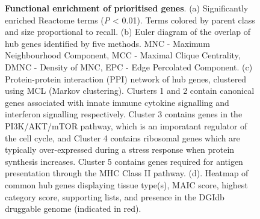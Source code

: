 \documentclass[
  11,
  a4paper,
]{article}
\begin{document}
\begin{figure}


\caption{\label{fig-fig2}\textbf{Functional enrichment of prioritised
genes}. (a) Significantly enriched Reactome terms (\emph{P} \textless{}
0.01). Terms colored by parent class and size proportional to recall.
(b) Euler diagram of the overlap of hub genes identified by five
methods. MNC - Maximum Neighbourhood Component, MCC - Maximal Clique
Centrality, DMNC - Density of MNC, EPC - Edge Percolated Component. (c)
Protein-protein interaction (PPI) network of hub genes, clustered using
MCL (Markov clustering). Clusters 1 and 2 contain canonical genes
associated with innate immune cytokine signalling and interferon
signalling respectively. Cluster 3 contains genes in the PI3K/AKT/mTOR
pathway, which is an imporatant regulator of the cell cycle, and Cluster
4 contains ribosomal genes which are typically over-expressed during a
stress response when protein synthesis increases. Cluster 5 contains
genes required for antigen presentation through the MHC Class II
pathway. (d). Heatmap of common hub genes displaying tissue type(s),
MAIC score, highest category score, supporting lists, and presence in
the DGIdb druggable genome (indicated in red).}

\end{figure}%
\end{document}
